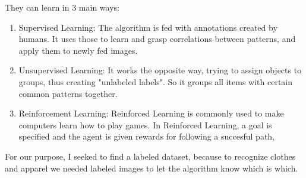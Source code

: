 They can learn in 3 main ways:
\begin{enumerate}
	\item Supervised Learning:
		The algorithm is fed with annotations created by humans. It uses those to learn and grasp correlations between patterns, and apply them to newly fed images.
	\item Unsupervised Learning:
		It works the opposite way, trying to assign objects to groups, thus creating "unlabeled labels". So it groups all items with certain common patterns together.
	\item Reinforcement Learning:
		Reinforced Learning is commonly used to make computers learn how to play games. In Reinforced Learning, a goal is specified and the agent is given rewards for following a succesful path,
\end{enumerate}
For our purpose, I seeked to find a labeled dataset, because to recognize clothes and apparel we needed labeled images to let the algorithm know which is which.



